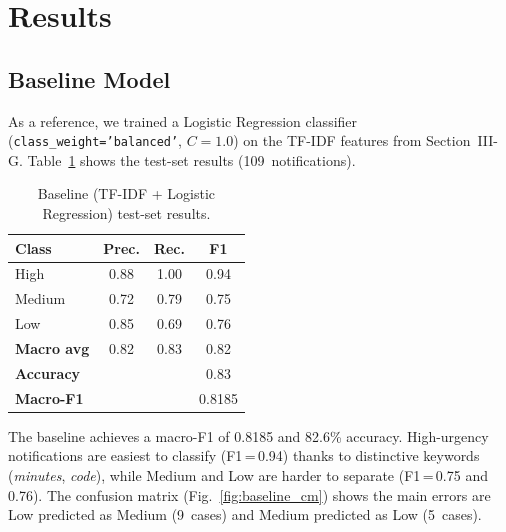 %

\section{Results}
\label{sec:results}

\subsection{Baseline Model}

As a reference, we trained a Logistic Regression classifier
(\texttt{class\_weight='balanced'}, $C=1.0$) on the TF-IDF features from
Section~III-G. Table~\ref{tab:baseline_results} shows the test-set
results (109~notifications).

\begin{table}[!t]
\centering
\caption{Baseline (TF-IDF + Logistic Regression) test-set results.}
\label{tab:baseline_results}
\begin{tabular}{lccc}
\hline
\textbf{Class} & \textbf{Prec.} & \textbf{Rec.} & \textbf{F1} \\
\hline
High   & 0.88 & 1.00 & 0.94 \\
Medium & 0.72 & 0.79 & 0.75 \\
Low    & 0.85 & 0.69 & 0.76 \\
\hline
\textbf{Macro avg} & 0.82 & 0.83 & 0.82 \\
\hline
\multicolumn{3}{l}{\textbf{Accuracy}} & 0.83 \\
\multicolumn{3}{l}{\textbf{Macro-F1}} & 0.8185 \\
\hline
\end{tabular}
\end{table}

The baseline achieves a macro-F1 of 0.8185 and 82.6\% accuracy.
High-urgency notifications are easiest to classify (F1\,=\,0.94) thanks
to distinctive keywords (\textit{minutes}, \textit{code}), while Medium
and Low are harder to separate (F1\,=\,0.75 and 0.76). The confusion
matrix (Fig.~\ref{fig:baseline_cm}) shows the main errors are Low
predicted as Medium (9~cases) and Medium predicted as Low (5~cases).

